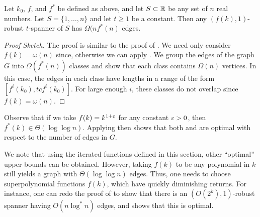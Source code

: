 \documentclass{patmorin}
\begin{document}
%
%
%

\begin{thm}
Let $k_0$, $f$, and $f^*$ be defined as above, and let $S\subset \mathbb{R}$
be any set of $n$ real numbers.  Let $S=\{1,\ldots,n\}$ and let $t\ge
1$ be a constant.  Then any $(f(k),1)$-robust $t$-spanner of $S$ has
$\Omega(nf^*(n)$ edges.
\end{thm}

\begin{proof}[Proof Sketch]
The proof is similar to the proof of .
We need only consider $f(k)=\omega(n)$ since, otherwise we can apply
.  We group the edges of the graph $G$ into
$\Omega(f^*(n))$ classes and show that each class contains $\Omega(n)$
vertices.  In this case, the edges in each class have lengths in a
range of the form $[f^i(k_0),tcf^{i}(k_0)]$.  For large enough $i$,
these classes do not overlap since $f(k)=\omega(n)$.
\end{proof}

\begin{rem}
Observe that if we take $f(k)=k^{1+\varepsilon}$ for any constant $\varepsilon >0$, then
$f^*(k) \in \Theta(\log\log n)$.  Applying 
then shows that both  and 
are optimal with respect to the number of edges in $G$.
\end{rem}

\begin{rem}
We note that using the iterated functions defined in this section, other
``optimal'' upper-bounds can be obtained.  However, taking $f(k)$ to
be any polynomial in $k$ still yields a graph with $\Theta(\log\log n)$
edges.  Thus, one needs to choose superpolynomial functions $f(k)$, which
have quickly diminishing returns.  For instance, one can redo the proof
of  to show that there is an $(O(2^k),1)$-robust
spanner having $O(n\log^* n)$ edges, and 
shows that this is optimal.
\end{rem}
\end{document}
